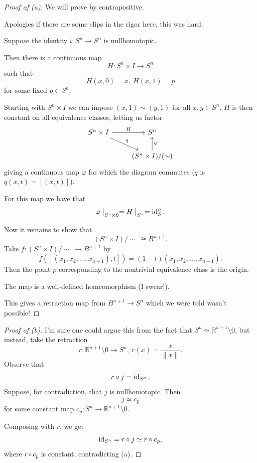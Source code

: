 \documentclass[11pt]{article}
\begin{document}
\begin{proof}[Proof of (a)]
    We will prove by contrapositive. 

    Apologies if there are some slips in the rigor here, 
    this was hard. 

    Suppose the identity $i : S^n \to S^n$ 
    is nullhomotopic. 

    Then there is a continuous map 
    \[
        H : S^n \times I \to S^n 
    \]
    such that 
    \[
        H(x,0) = x, \ H(x,1) = p 
    \]
    for some fixed $p \in S^n$. 

    Starting with $S^n \times I$ we can impose 
    $(x,1) \sim (y,1)$ for all 
    $x,y \in S^n$. $H$ is then constant on all 
    equivalence classes, letting us factor 
    \[
        \begin{tikzcd}
            S^n \times I \ar[r, "H"] \ar[dr, "q"] & S^n \\ 
            & (S^n \times I)/(\sim) \ar[u, "\varphi"']
        \end{tikzcd}
    \]
    giving a continuous map $\varphi$ for which the 
    diagram commutes ($q$ is $q(x,t) = [(x,t)]$). 
    
    For this map we have that 
    \[
        \varphi \bigm|_{S^n \times 0} 
        = H\bigm|_{S^n} = \operatorname{id}_S^n.  
    \]

    Now it remains to show that 
    \[
        (S^n \times I)/\sim 
        \ \cong B^{n+1}. 
    \]
    Take $f : (S^n \times I)/\sim \ \longrightarrow 
    B^{n+1}$ by 
    \[
        f([(x_1,x_2,\ldots,x_{n+1}),t]) = 
        (1-t)(x_1,x_2,\ldots,x_{n+1}).  
    \]
    Then the point $p$ corresponding to the 
    nontrivial equivalence class is the origin. 

    The map is a well-defined homeomorphism (I swear!).

    This gives a retraction map from $B^{n+1} \to S^n$ 
    which we were told wasn't possible! 
\end{proof}
\begin{proof}[Proof of (b)]
    I'm sure one could argue this from the fact that 
    $S^n \simeq \mathbb R^{n+1} \setminus 0$, but instead,
    take the retraction 
    \[
        r : \mathbb R^{n+1} \setminus 0 
        \to S^n, \ r(x) = \frac{x}{\|x\|}. 
    \]
    Observe that 
    \[
        r \circ j = \operatorname{id}_{S^n}. 
    \]
    Suppose, for contradiction, that $j$ is nullhomotopic. 
    Then 
    \[
        j \simeq c_p
    \]
    for some constant map $c_p : S^n \to \mathbb R^{n+1} 
    \setminus 0$. 

    Composing with $r$, we get 
    \[
        \operatorname{id}_{S^n} = r \circ j \simeq r \circ c_p, 
    \]
    where $r \circ c_p$ is constant, contradicting (a).    
\end{proof}
\end{document}
